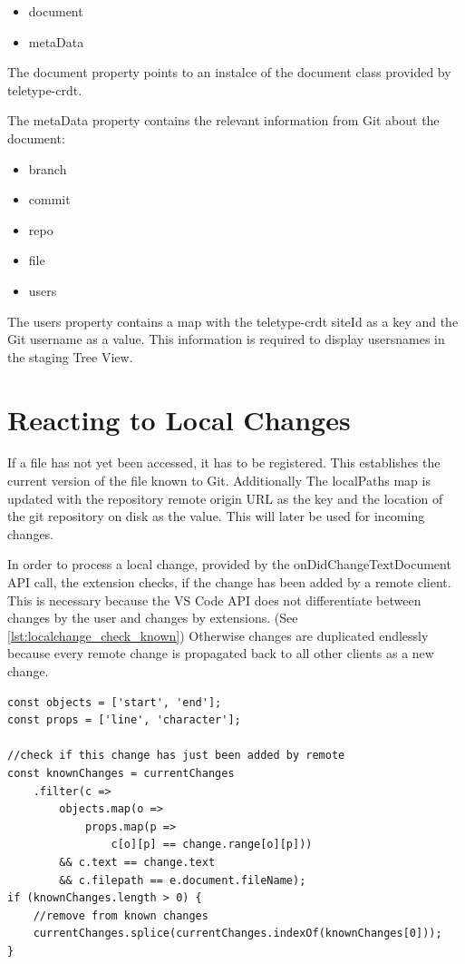 \begin{itemize}
    \item document
    \item metaData
\end{itemize}

The document property points to an instalce of the document class provided by teletype-crdt.

The metaData property contains the relevant information from Git about the document:
\begin{itemize}
    \item branch
    \item commit
    \item repo
    \item file
    \item users
\end{itemize}

The users property contains a map with the teletype-crdt siteId as a key and the Git username as a value.
This information is required to display usersnames in the staging Tree View.

\section{Reacting to Local Changes}
If a file has not yet been accessed, it has to be registered. This establishes the current version of the file known to Git. Additionally The localPaths map is updated with the repository remote origin URL as the key and the location of the git repository on disk as the value. This will later be used for incoming changes.

In order to process a local change, provided by the onDidChangeTextDocument API call, the extension checks, if the change has been added by a remote client. This is necessary because the VS Code API does not differentiate between changes by the user and changes by extensions. (See \autoref{lst:localchange_check_known}) Otherwise changes are duplicated endlessly because every remote change is propagated back to all other clients as a new change.

\begin{lstlisting}[label={lst:localchange_check_known}, caption=Is This Change Already Known to The Data Model? ]
const objects = ['start', 'end'];
const props = ['line', 'character'];

//check if this change has just been added by remote
const knownChanges = currentChanges
    .filter(c => 
        objects.map(o => 
            props.map(p => 
                c[o][p] == change.range[o][p])) 
        && c.text == change.text 
        && c.filepath == e.document.fileName);
if (knownChanges.length > 0) {
    //remove from known changes
    currentChanges.splice(currentChanges.indexOf(knownChanges[0]));
}
\end{lstlisting}


